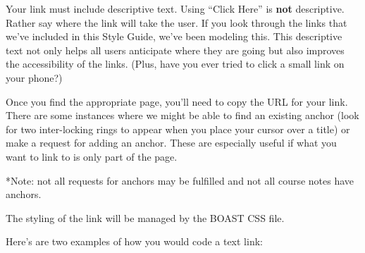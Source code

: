 \documentclass[
]{book}
\newenvironment{Shaded}{\begin{snugshade}}{\end{snugshade}}
\newcommand{\CommentTok}[1]{\textcolor[rgb]{0.56,0.35,0.01}{\textit{#1}}}
\newcommand{\DataTypeTok}[1]{\textcolor[rgb]{0.13,0.29,0.53}{#1}}
\newcommand{\KeywordTok}[1]{\textcolor[rgb]{0.13,0.29,0.53}{\textbf{#1}}}
\newcommand{\NormalTok}[1]{#1}
\newcommand{\OperatorTok}[1]{\textcolor[rgb]{0.81,0.36,0.00}{\textbf{#1}}}
\newcommand{\StringTok}[1]{\textcolor[rgb]{0.31,0.60,0.02}{#1}}
\begin{document}
Your link must include descriptive text. Using ``Click Here'' is \textbf{not} descriptive. Rather say where the link will take the user. If you look through the links that we've included in this Style Guide, we've been modeling this. This descriptive text not only helps all users anticipate where they are going but also improves the accessibility of the links. (Plus, have you ever tried to click a small link on your phone?)

Once you find the appropriate page, you'll need to copy the URL for your link. There are some instances where we might be able to find an existing anchor (look for two inter-locking rings to appear when you place your cursor over a title) or make a request for adding an anchor. These are especially useful if what you want to link to is only part of the page.

*Note: not all requests for anchors may be fulfilled and not all course notes have anchors.

The styling of the link will be managed by the BOAST CSS file.

Here's are two examples of how you would code a text link:

\begin{Shaded}
\end{Shaded}
\end{document}
